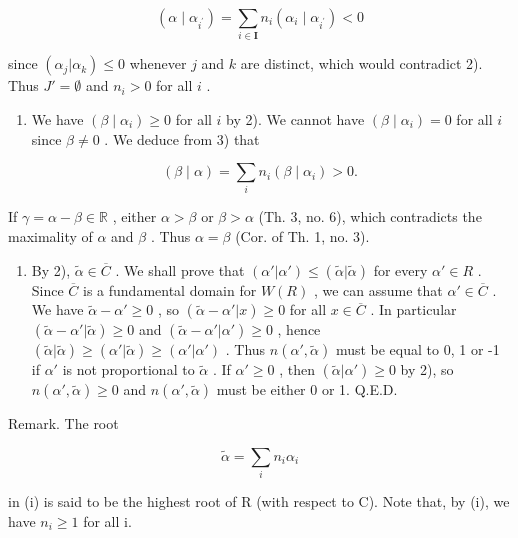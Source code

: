\[
\left(\alpha \mid \alpha_ {i ^ {\prime}}\right) = \sum_ {i \in \mathbf {I}} n _ {i} \left(\alpha_ {i} \mid \alpha_ {i ^ {\prime}}\right) <   0
\]

since \((\alpha_{j}|\alpha_{k})\leqslant 0\) whenever \(j\) and \(k\) are distinct, which would contradict 2). Thus \(J' = \emptyset\) and \(n_i > 0\) for all \(i\) .

\begin{enumerate}
\def\labelenumi{\arabic{enumi})}
\setcounter{enumi}{3}
\tightlist
\item
  We have \((\beta \mid \alpha_i) \geqslant 0\) for all \(i\) by 2). We cannot have \((\beta \mid \alpha_i) = 0\) for all \(i\) since \(\beta \neq 0\) . We deduce from 3) that
\end{enumerate}

\[
(\beta \mid \alpha) = \sum_ {i} n _ {i} (\beta \mid \alpha_ {i}) > 0.
\]

If \(\gamma = \alpha - \beta \in \mathbb{R}\) , either \(\alpha > \beta\) or \(\beta > \alpha\) (Th. 3, no. 6), which contradicts the maximality of \(\alpha\) and \(\beta\) . Thus \(\alpha = \beta\) (Cor. of Th. 1, no. 3).

\begin{enumerate}
\def\labelenumi{\arabic{enumi})}
\setcounter{enumi}{4}
\tightlist
\item
  By 2), \(\tilde{\alpha} \in \overline{C}\) . We shall prove that \((\alpha'|\alpha') \leqslant (\tilde{\alpha}|\tilde{\alpha})\) for every \(\alpha' \in R\) . Since \(\overline{C}\) is a fundamental domain for \(W(R)\) , we can assume that \(\alpha' \in \overline{C}\) . We have \(\tilde{\alpha} - \alpha' \geqslant 0\) , so \((\tilde{\alpha} - \alpha' | x) \geqslant 0\) for all \(x \in \overline{C}\) . In particular \((\tilde{\alpha} - \alpha' |\tilde{\alpha}) \geqslant 0\) and \((\tilde{\alpha} - \alpha' |\alpha') \geqslant 0\) , hence \((\tilde{\alpha}|\tilde{\alpha}) \geqslant (\alpha'|\tilde{\alpha}) \geqslant (\alpha'|\alpha')\) . Thus \(n(\alpha',\tilde{\alpha})\) must be equal to 0, 1 or -1 if \(\alpha'\) is not proportional to \(\tilde{\alpha}\) . If \(\alpha' \geqslant 0\) , then \((\tilde{\alpha}|\alpha') \geqslant 0\) by 2), so \(n(\alpha',\tilde{\alpha}) \geqslant 0\) and \(n(\alpha',\tilde{\alpha})\) must be either 0 or 1. Q.E.D.
\end{enumerate}

Remark. The root

\[
\tilde {\alpha} = \sum_ {i} n _ {i} \alpha_ {i}
\]

in (i) is said to be the highest root of R (with respect to C). Note that, by (i), we have \(n_{i} \geqslant 1\) for all i.

